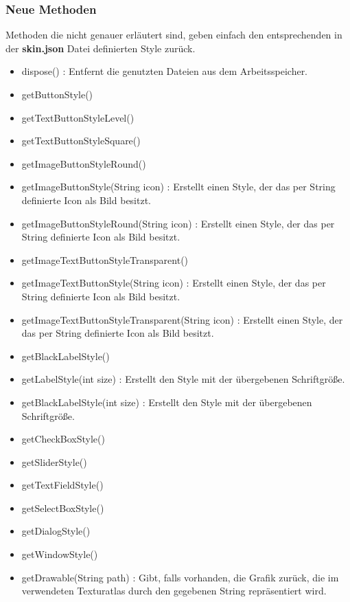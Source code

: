 \subsubsection{Neue Methoden}
Methoden die nicht genauer erläutert sind, geben einfach den entsprechenden in der \textbf{skin.json} Datei definierten Style zurück.
\begin{itemize}
\item dispose() : Entfernt die genutzten Dateien aus dem Arbeitsspeicher. 
\item getButtonStyle()
\item getTextButtonStyleLevel()
\item getTextButtonStyleSquare()
\item getImageButtonStyleRound()
\item getImageButtonStyle(String icon) : Erstellt einen Style, der das per String definierte Icon als Bild besitzt.
\item getImageButtonStyleRound(String icon) : Erstellt einen Style, der das per String definierte Icon als Bild besitzt.
\item getImageTextButtonStyleTransparent()
\item getImageTextButtonStyle(String icon) : Erstellt einen Style, der das per String definierte Icon als Bild besitzt.
\item getImageTextButtonStyleTransparent(String icon) : Erstellt einen Style, der das per String definierte Icon als Bild besitzt.
\item getBlackLabelStyle()
\item getLabelStyle(int size) : Erstellt den Style mit der übergebenen Schriftgröße.
\item getBlackLabelStyle(int size) : Erstellt den Style mit der übergebenen Schriftgröße.
\item getCheckBoxStyle()
\item getSliderStyle()
\item getTextFieldStyle()
\item getSelectBoxStyle()
\item getDialogStyle()
\item getWindowStyle()
\item getDrawable(String path) : Gibt, falls vorhanden, die Grafik zurück, die im verwendeten Texturatlas durch den gegebenen String repräsentiert wird.
\end{itemize}
